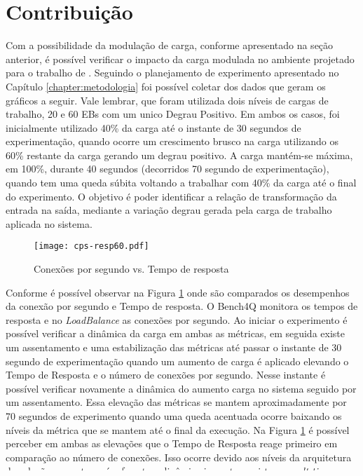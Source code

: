 \section{Contribuição}
Com a possibilidade da modulação de carga, conforme apresentado na seção anterior, é possível verificar o impacto da carga modulada no ambiente projetado para o trabalho de . Seguindo o planejamento de experimento apresentado no Capítulo \ref{chapter:metodologia} foi possível coletar dos dados que geram os gráficos a seguir.
Vale lembrar, que foram utilizada dois níveis de cargas de trabalho, 20 e 60 EBs com um unico Degrau Positivo. Em ambos os casos, foi inicialmente utilizado 40\% da carga até o instante de 30 segundos de experimentação, quando ocorre um crescimento brusco na carga utilizando os 60\% restante da carga gerando um degrau positivo. A carga mantém-se máxima, em 100\%, durante 40 segundos (decorridos 70 segundo de experimentação), quando tem uma queda súbita voltando a trabalhar com 40\% da carga até o final do experimento. O objetivo é poder identificar a relação de transformação da entrada na saída, mediante a variação degrau gerada pela carga de trabalho aplicada no sistema.

\begin{figure}[htb]
	\centering
	\texttt{[image: cps-resp60.pdf]}	
	\caption{Conexões por segundo vs. Tempo de resposta}
	\label{fig:cps-resp60}
	\fdadospesquisa
\end{figure}

Conforme é possível observar na Figura \ref{fig:cps-resp60} onde são comparados os desempenhos da conexão por segundo e Tempo de resposta. O Bench4Q monitora os tempos de resposta e no \textit{LoadBalance} as conexões por segundo. Ao iniciar o experimento é possível verificar a dinâmica da carga em ambas as métricas, em seguida existe um assentamento e uma estabilização das métricas até passar o instante de 30 segundo de experimentação quando um aumento de carga é aplicado elevando o Tempo de Resposta e o número de conexões por segundo. Nesse instante é possível verificar novamente a dinâmica do aumento carga no sistema seguido por um assentamento. Essa elevação das métricas se mantem aproximadamente por 70 segundos de experimento quando uma queda acentuada ocorre baixando os níveis da métrica que se mantem até o final da execução. 
Na Figura \ref{fig:cps-resp60} é possível perceber em ambas as elevações que o Tempo de Resposta reage primeiro em comparação ao número de conexões. Isso ocorre devido aos níveis da arquitetura da solução, esse atraso é referente a dinâmica inerente ao sistema \textit{mult-tiers}. Entretanto, na queda do volume de carga, no intervalo de 70 a 75 segundos, o Tempo de Resposta reage primeiro a queda de carga quando comparado ao número de conexões por segundo. Devido ao dinamismo intrínseco no sistema \textit{mult-tiers}, o Tempo de resposta não se apresenta como uma boa métrica de comparação. 

